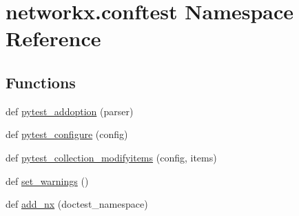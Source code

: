 \hypertarget{namespacenetworkx_1_1conftest}{}\section{networkx.\+conftest Namespace Reference}
\label{namespacenetworkx_1_1conftest}
\subsection*{Functions}
\begin{DoxyCompactItemize}
\item 
def \hyperlink{namespacenetworkx_1_1conftest_aa489724b6e0b116191e1ccfa7afc5c8d}{pytest\+\_\+addoption} (parser)
\item 
def \hyperlink{namespacenetworkx_1_1conftest_ab2b9973b9b0bbdcd095281963257311b}{pytest\+\_\+configure} (config)
\item 
def \hyperlink{namespacenetworkx_1_1conftest_a40b3d916651f68cc1f97f7d658f3fddd}{pytest\+\_\+collection\+\_\+modifyitems} (config, items)
\item 
def \hyperlink{namespacenetworkx_1_1conftest_a005b3a3200a0c60094281a5679918888}{set\+\_\+warnings} ()
\item 
def \hyperlink{namespacenetworkx_1_1conftest_a1b14c25037d76a454dfeffa29696f5bb}{add\+\_\+nx} (doctest\+\_\+namespace)
\end{DoxyCompactItemize}
